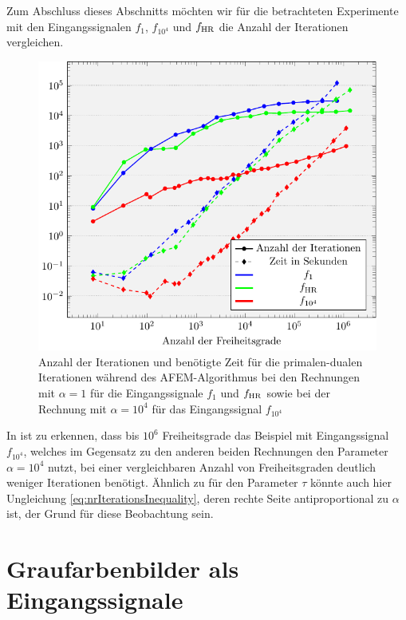 Zum Abschluss dieses Abschnitts möchten wir für die betrachteten Experimente
mit den Eingangssignalen $f_1$, $f_{10^4}$ und $f_\textup{HR}$ die Anzahl der
Iterationen vergleichen.
\begin{figure}[p]
  \centering
  \includegraphics[width=.8\linewidth]
    {pictures/chapExperiments/secConclusion/nrIterComp/exactSol/misc.pdf}
  \caption{Anzahl der Iterationen und benötigte Zeit für die primalen-dualen
    Iterationen während des AFEM-Algorithmus bei den Rechnungen mit $\alpha=1$
    für die Eingangssignale $f_1$ und $f_\textup{HR}$ sowie bei der Rechnung mit
    $\alpha=10^4$ für das Eingangssignal $f_{10^4}$} 
  \label{fig:inSiNrIterComparison}
\end{figure}
In  ist zu erkennen, dass bis $10^6$
Freiheitsgrade das Beispiel mit Eingangssignal $f_{10^4}$, welches im Gegensatz
zu den anderen beiden Rechnungen den Parameter $\alpha=10^4$ nutzt, bei einer
vergleichbaren Anzahl von Freiheitsgraden deutlich weniger Iterationen
benötigt. 
Ähnlich zu  für den Parameter
$\tau$ könnte auch hier Ungleichung \eqref{eq:nrIterationsInequality}, deren
rechte Seite antiproportional zu $\alpha$ ist, der Grund für diese Beobachtung
sein.

\vfill


\section{Graufarbenbilder als Eingangssignale}
\label{sec:grayscalePicturesAsInputSignal}


